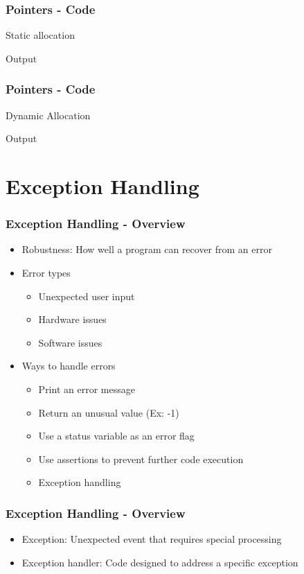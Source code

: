 \documentclass[c, aspectratio=169]{beamer}
\begin{document}
\begin{frame}\frametitle{Pointers - Code}
Static allocation


Output

\end{frame}

\begin{frame}\frametitle{Pointers - Code}
Dynamic Allocation


Output

\end{frame}

\section{Exception Handling}
\begin{frame}\frametitle{Exception Handling - Overview}
\begin{itemize}
\item Robustness: How well a program can recover from an error
\item Error types
	\begin{itemize}
	\item Unexpected user input
	\item Hardware issues
	\item Software issues
	\end{itemize}
\item Ways to handle errors
	\begin{itemize}
	\item Print an error message
	\item Return an unusual value (Ex: -1)
	\item Use a status variable as an error flag
	\item Use assertions to prevent further code execution
	\item Exception handling
	\end{itemize}
\end{itemize}
\end{frame}

\begin{frame}\frametitle{Exception Handling - Overview}
\begin{itemize}
\item Exception: Unexpected event that requires special processing
\item Exception handler: Code designed to address a specific exception
\end{itemize}
\end{frame}
\end{document}
